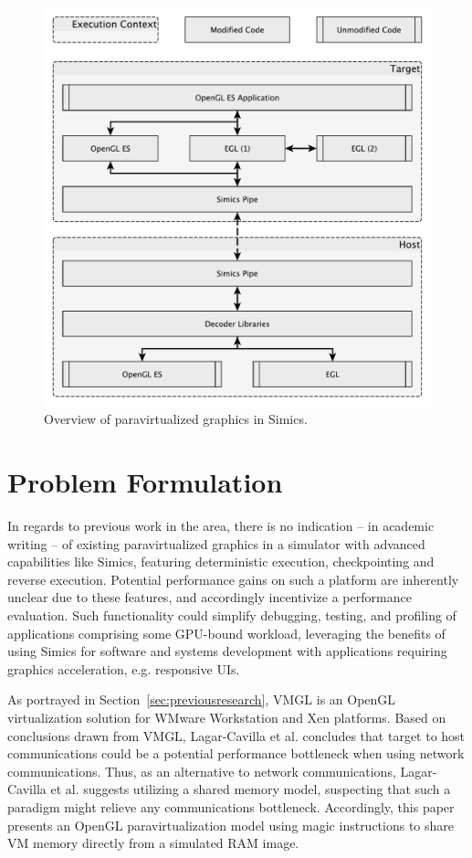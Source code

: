 
\begin{figure}
\centering
\includegraphics[width=\linewidth]{img/yedoverview.pdf}
\caption{Overview of paravirtualized graphics in Simics.}
\label{fig:overview}
\end{figure}

\section{Problem Formulation}
\label{sec:problemformulation}
In regards to previous work in the area, there is no indication -- in academic writing -- of existing paravirtualized graphics in a simulator with advanced capabilities like Simics, featuring deterministic execution, checkpointing and reverse execution.
Potential performance gains on such a platform are inherently unclear due to these features, and accordingly incentivize a performance evaluation.
Such functionality could simplify debugging, testing, and profiling of applications comprising some GPU-bound workload, leveraging the benefits of using Simics for software and systems development with applications requiring graphics acceleration, e.g. responsive UIs.

As portrayed in Section~\ref{sec:previousresearch}, VMGL is an OpenGL virtualization solution for WMware Workstation and Xen platforms.
Based on conclusions drawn from VMGL, Lagar-Cavilla et al. concludes that target to host communications could be a potential performance bottleneck when using network communications.
Thus, as an alternative to network communications, Lagar-Cavilla et al. suggests utilizing a shared memory model, suspecting that such a paradigm might relieve any communications bottleneck.
Accordingly, this paper presents an OpenGL paravirtualization model using magic instructions to share VM memory directly from a simulated RAM image.

